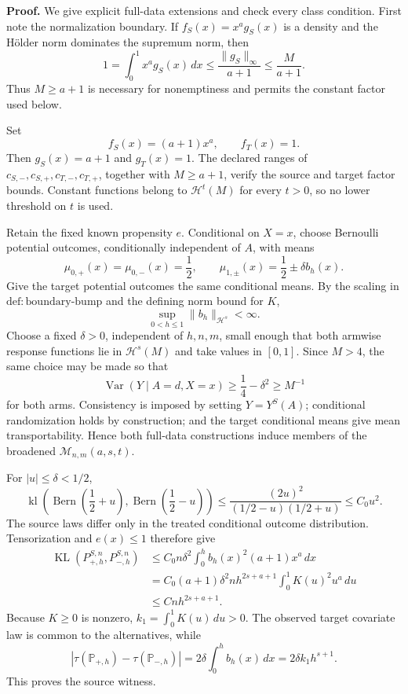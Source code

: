 \textbf{Proof.}
We give explicit full-data extensions and check every class condition. First note the normalization boundary. If \(f_S(x)=x^ag_S(x)\) is a density and the H\"older norm dominates the supremum norm, then
\[
1=\int_0^1x^ag_S(x)\,dx
\le \frac{\lVert g_S\rVert_\infty}{a+1}
\le \frac{M}{a+1}.
\]
Thus \(M\ge a+1\) is necessary for nonemptiness and permits the constant factor used below.

Set
\[
f_S(x)=(a+1)x^a,
\qquad
f_T(x)=1.
\]
Then \(g_S(x)=a+1\) and \(g_T(x)=1\). The declared ranges of \(c_{S,-},c_{S,+},c_{T,-},c_{T,+}\), together with \(M\ge a+1\), verify the source and target factor bounds. Constant functions belong to \(\mathcal H^t(M)\) for every \(t>0\), so no lower threshold on \(t\) is used.

Retain the fixed known propensity \(e\). Conditional on \(X=x\), choose Bernoulli potential outcomes, conditionally independent of \(A\), with means
\[
\mu_{0,+}(x)=\mu_{0,-}(x)=\frac12,
\qquad
\mu_{1,\pm}(x)=\frac12\pm\delta b_h(x).
\]
Give the target potential outcomes the same conditional means. By the scaling in \(\mathrm{def:boundary\text{-}bump}\) and the defining norm bound for \(K\),
\[
\sup_{0<h\le1}\lVert b_h\rVert_{\mathcal H^s}<\infty.
\]
Choose a fixed \(\delta>0\), independent of \(h,n,m\), small enough that both armwise response functions lie in \(\mathcal H^s(M)\) and take values in \([0,1]\). Since \(M>4\), the same choice may be made so that
\[
\operatorname{Var}(Y\mid A=d,X=x)
\ge \frac14-\delta^2
\ge M^{-1}
\]
for both arms. Consistency is imposed by setting \(Y=Y^S(A)\); conditional randomization holds by construction; and the target conditional means give mean transportability. Hence both full-data constructions induce members of the broadened \(\mathcal M_{n,m}(a,s,t)\).

For \(|u|\le\delta<1/2\),
\[
\operatorname{kl}\!\left(\operatorname{Bern}\!\left(\frac12+u\right),
\operatorname{Bern}\!\left(\frac12-u\right)\right)
\le \frac{(2u)^2}{(1/2-u)(1/2+u)}
\le C_0u^2.
\]
The source laws differ only in the treated conditional outcome distribution. Tensorization and \(e(x)\le1\) therefore give
\[
\begin{aligned}
\operatorname{KL}(P_{+,h}^{S,n},P_{-,h}^{S,n})
&\le C_0n\delta^2\int_0^hb_h(x)^2(a+1)x^a\,dx\\
&=C_0(a+1)\delta^2nh^{2s+a+1}
\int_0^1K(u)^2u^a\,du\\
&\le Cnh^{2s+a+1}.
\end{aligned}
\]
Because \(K\ge0\) is nonzero, \(k_1=\int_0^1K(u)\,du>0\). The observed target covariate law is common to the alternatives, while
\[
\left|\tau(\mathbb P_{+,h})-\tau(\mathbb P_{-,h})\right|
=2\delta\int_0^hb_h(x)\,dx
=2\delta k_1h^{s+1}.
\]
This proves the source witness.

